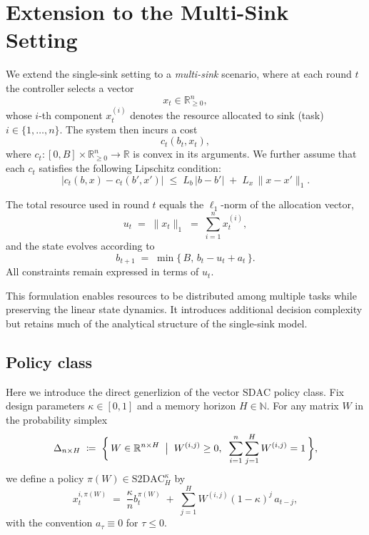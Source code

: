 \documentclass[11pt]{article}
\begin{document}
\section{Extension to the Multi-Sink Setting}

We extend the single-sink setting to a \emph{multi-sink} scenario, where at each round \(t\) the controller selects a vector
\[
x_t \in \mathbb{R}_{\ge 0}^n,
\]
whose \(i\)-th component \(x_t^{(i)}\) denotes the resource allocated to sink (task) \(i \in \{1,\ldots,n\}\).
The system then incurs a cost
\[
c_t(b_t, x_t),
\]
where \(c_t : [0,B] \times \mathbb{R}_{\ge 0}^n \to \mathbb{R}\) is convex in its arguments.  
We further assume that each \(c_t\) satisfies the following Lipschitz condition:
\begin{equation}
\label{eq:lip-c-x}
|c_t(b, x) - c_t(b', x')|
\;\le\;
L_b\, |b - b'| \;+\; L_x\, \|x - x'\|_1 .
\end{equation}

The total resource used in round \(t\) equals the \(\ell_1\)-norm of the allocation vector,
\[
u_t \;=\; \|x_t\|_1 \;=\; \sum_{i=1}^n x_t^{(i)},
\]
and the state evolves according to
\begin{equation}
\label{eq:battery-evo-W}
    b_{t+1} \;=\; \min\{\, B,\, b_t - u_t + a_t \,\}.
\end{equation}
All constraints remain expressed in terms of \(u_t\).

This formulation enables resources to be distributed among multiple tasks while preserving the linear state dynamics.
It introduces additional decision complexity but retains much of the analytical structure of the single-sink model.  





\subsection{Policy class}


Here we introduce the direct generlizion of the vector $\mathrm{SDAC}$ policy class.
Fix design parameters \(\kappa \in [0,1]\) and a memory horizon \(H \in \mathbb{N}\).  For any matrix \(W\)  in the probability simplex
\[
\Delta_{n \times H} \;\coloneqq\;
\biggl\{\,W\in\mathbb{R}^{n\times H} \;\bigm|\; W^{(i,j)} \ge 0, \;\; \sum_{i=1}^n\sum_{j=1}^H W^{(i,j)} = 1 \,\biggr\},
\]
we define a policy \(\pi(W) \in \mathrm{S2DAC}_H^\kappa\) by
\begin{equation}\label{eq:x-of-efficient}
x_t^{i,\pi(W)} \;=\; \frac{\kappa}{n} b_t^{\pi(W)} \;+\; \sum_{j=1}^H W^{(i,j)} (1-\kappa)^j \, a_{t-j},
\end{equation}
with the convention \(a_\tau \equiv 0\) for \(\tau \le 0\).
\end{document}
